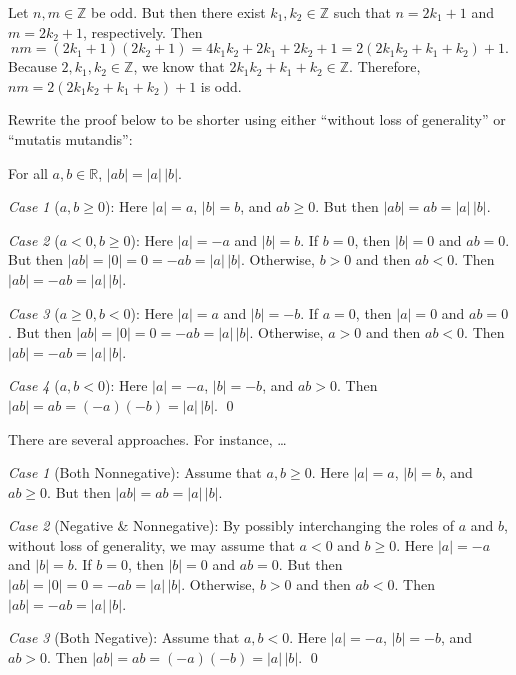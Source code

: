 \documentclass[11pt,letterpaper]{article}
\begin{document}
\sol Let $n, m \in \mathbb{Z}$ be odd. But then there exist $k_1, k_2 \in \mathbb{Z}$ such that $n= 2k_1 + 1$ and $m= 2k_2 + 1$, respectively. Then
	\[
	nm= (2k_1 + 1)(2k_2 + 1)= 4k_1k_2 + 2k_1 + 2k_2 + 1= 2 (2k_1k_2 + k_1 + k_2) + 1.
	\]
Because $2, k_1, k_2 \in \mathbb{Z}$, we know that $2k_1k_2 + k_1 + k_2 \in \mathbb{Z}$. Therefore, $nm= 2 (2k_1k_2 + k_1 + k_2) + 1$ is odd. 





\newpage





 Rewrite the proof below to be shorter using either ``without loss of generality'' or ``mutatis mutandis'': \pspace

\begin{thm*}
For all $a, b \in \mathbb{R}$, $|ab|= |a| \, |b|$. 
\end{thm*}

\pf

\textit{Case 1} ($a, b \geq 0$): Here $|a|= a$, $|b|= b$, and $ab \geq 0$. But then $|ab|= ab = |a| \, |b|$. 

\textit{Case 2} ($a < 0, b \geq 0$): Here $|a|= -a$ and $|b|= b$. If $b= 0$, then $|b|= 0$ and $ab= 0$. But then $|ab|= |0|= 0 = -ab= |a| \,|b|$. Otherwise, $b > 0$ and then $ab < 0$. Then $|ab|= -ab= |a| \, |b|$. 

\textit{Case 3} ($a \geq 0, b < 0$): Here $|a|= a$ and $|b|= -b$. If $a= 0$, then $|a|= 0$ and $ab= 0$. But then $|ab|= |0|= 0= -ab= |a| \, |b|$. Otherwise, $a > 0$ and then $ab < 0$. Then $|ab|= -ab= |a| \, |b|$. 

\textit{Case 4} ($a, b < 0$): Here $|a|= -a$, $|b|= -b$, and $ab > 0$. Then $|ab|= ab= (-a)(-b)= |a| \, |b|$. \qed \pspace

\sol There are several approaches. For instance, \dots

\pf

\textit{Case 1} (Both Nonnegative): Assume that $a, b \geq 0$. Here $|a|= a$, $|b|= b$, and $ab \geq 0$. But then $|ab|= ab = |a| \, |b|$. 

\textit{Case 2} (Negative \& Nonnegative): By possibly interchanging the roles of $a$ and $b$, without loss of generality, we may assume that $a< 0$ and $b \geq 0$. Here $|a|= -a$ and $|b|= b$. If $b= 0$, then $|b|= 0$ and $ab= 0$. But then $|ab|= |0|= 0 = -ab= |a| \,|b|$. Otherwise, $b > 0$ and then $ab < 0$. Then $|ab|= -ab= |a| \, |b|$. 

\textit{Case 3} (Both Negative): Assume that $a, b < 0$. Here $|a|= -a$, $|b|= -b$, and $ab > 0$. Then $|ab|= ab= (-a)(-b)= |a| \, |b|$. \qed \pspace
\end{document}
